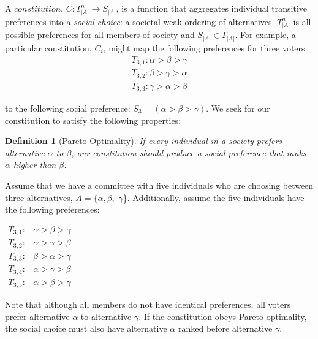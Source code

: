 \documentclass{amsart}
\newtheorem{definition}{Definition}
\theoremstyle{plain}
\begin{document}
\vskip 0.25cm

A $constitution$, $C: T^n_{|A|} \rightarrow S_{|A|}$, is a function that aggregates individual transitive preferences into a \emph{social choice}: a societal weak ordering of alternatives. $T^n_{|A|}$ is all possible preferences for all members of society and $S_{|A|} \in T_{|A|}$. For example, a particular constitution, $C_i$, might map the following preferences for three voters:
\begin{align*}
    T_{3,1}: \alpha > \beta > \gamma \\
    T_{3,2}: \beta > \gamma > \alpha \\
    T_{3,3}: \gamma > \alpha > \beta
\end{align*}

\vskip 0.25cm

\noindent to the following social preference: $S_3 = (\alpha > \beta > \gamma)$. We seek for our constitution to satisfy the following properties:

\begin{definition}[Pareto Optimality]
If every individual in a society prefers alternative $\alpha$ to $\beta$, our constitution should produce a social preference that ranks $\alpha$ higher than $\beta$.
\end{definition}

Assume that we have a committee with five individuals who are choosing between three alternatives, $A = \{\alpha, \beta,$ $\gamma$\}. Additionally, assume the five individuals have the following preferences:

\vskip 0.5cm

\begin{center}
$\begin{array}{cc}
      T_{3,1}: & \text{$\alpha > \beta > \gamma$}\\
      T_{3,2}: & \text{$\alpha > \gamma > \beta$}\\
      T_{3,3}: & \text{$\beta > \alpha > \gamma$}\\
      T_{3,4}: & \text{$\alpha > \gamma > \beta$}\\ 
      T_{3,5}: & \text{$\alpha > \beta > \gamma$}
\end{array}$
\end{center}

\vskip 0.5cm

\noindent Note that although all members do not have identical preferences, all voters prefer alternative $\alpha$ to alternative $\gamma$. If the constitution obeys Pareto optimality, the social choice must also have alternative $\alpha$ ranked before alternative $\gamma$.
\end{document}
